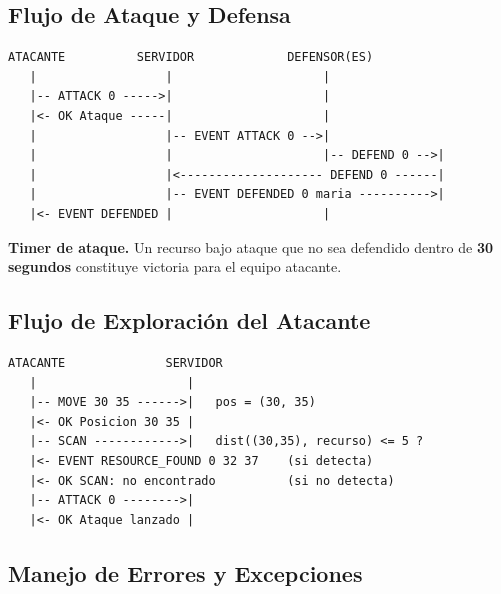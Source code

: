 \documentclass[12pt, letterpaper]{article}
\begin{document}
\subsection{Flujo de Ataque y Defensa}

\begin{lstlisting}
ATACANTE          SERVIDOR             DEFENSOR(ES)
   |                  |                     |
   |-- ATTACK 0 ----->|                     |
   |<- OK Ataque -----|                     |
   |                  |-- EVENT ATTACK 0 -->|
   |                  |                     |-- DEFEND 0 -->|
   |                  |<-------------------- DEFEND 0 ------|
   |                  |-- EVENT DEFENDED 0 maria ---------->|
   |<- EVENT DEFENDED |                     |
\end{lstlisting}

\begin{nota}
\textbf{Timer de ataque.} Un recurso bajo ataque que no sea defendido dentro de
\textbf{30 segundos} constituye victoria para el equipo atacante.
\end{nota}

\subsection{Flujo de Exploración del Atacante}

\begin{lstlisting}
ATACANTE              SERVIDOR
   |                     |
   |-- MOVE 30 35 ------>|   pos = (30, 35)
   |<- OK Posicion 30 35 |
   |-- SCAN ------------>|   dist((30,35), recurso) <= 5 ?
   |<- EVENT RESOURCE_FOUND 0 32 37    (si detecta)
   |<- OK SCAN: no encontrado          (si no detecta)
   |-- ATTACK 0 -------->|
   |<- OK Ataque lanzado |
\end{lstlisting}

\subsection{Manejo de Errores y Excepciones}
\end{document}

